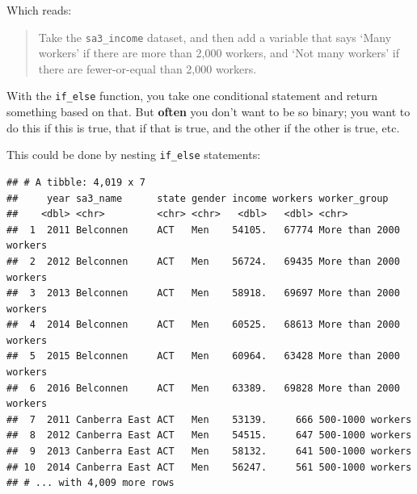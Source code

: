 \documentclass[]{book}
\newenvironment{Shaded}{\begin{snugshade}}{\end{snugshade}}
\newcommand{\DataTypeTok}[1]{\textcolor[rgb]{0.13,0.29,0.53}{#1}}
\newcommand{\DecValTok}[1]{\textcolor[rgb]{0.00,0.00,0.81}{#1}}
\newcommand{\KeywordTok}[1]{\textcolor[rgb]{0.13,0.29,0.53}{\textbf{#1}}}
\newcommand{\NormalTok}[1]{#1}
\newcommand{\OperatorTok}[1]{\textcolor[rgb]{0.81,0.36,0.00}{\textbf{#1}}}
\newcommand{\StringTok}[1]{\textcolor[rgb]{0.31,0.60,0.02}{#1}}
\begin{document}
Which reads:

\begin{quote}
Take the \texttt{sa3\_income} dataset, and then add a variable that says `Many workers' if there are more than 2,000 workers, and `Not many workers' if there are fewer-or-equal than 2,000 workers.
\end{quote}

With the \texttt{if\_else} function, you take one conditional statement and return something based on that. But \textbf{often} you don't want to be so binary; you want to do this if this is true, that if that is true, and the other if the other is true, etc.

This could be done by nesting \texttt{if\_else} statements:

\begin{Shaded}
\end{Shaded}

\begin{verbatim}
## # A tibble: 4,019 x 7
##     year sa3_name      state gender income workers worker_group          
##    <dbl> <chr>         <chr> <chr>   <dbl>   <dbl> <chr>                 
##  1  2011 Belconnen     ACT   Men    54105.   67774 More than 2000 workers
##  2  2012 Belconnen     ACT   Men    56724.   69435 More than 2000 workers
##  3  2013 Belconnen     ACT   Men    58918.   69697 More than 2000 workers
##  4  2014 Belconnen     ACT   Men    60525.   68613 More than 2000 workers
##  5  2015 Belconnen     ACT   Men    60964.   63428 More than 2000 workers
##  6  2016 Belconnen     ACT   Men    63389.   69828 More than 2000 workers
##  7  2011 Canberra East ACT   Men    53139.     666 500-1000 workers      
##  8  2012 Canberra East ACT   Men    54515.     647 500-1000 workers      
##  9  2013 Canberra East ACT   Men    58132.     641 500-1000 workers      
## 10  2014 Canberra East ACT   Men    56247.     561 500-1000 workers      
## # ... with 4,009 more rows
\end{verbatim}
\end{document}
